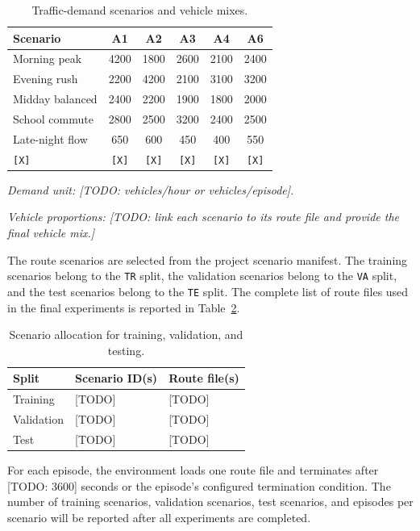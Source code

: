 \begin{table}[t]
\caption{Traffic-demand scenarios and vehicle mixes.}
\label{tab:traffic_demand}
\centering
\small
\begin{tabular}{lccccc}
\hline
\textbf{Scenario} & \textbf{A1} & \textbf{A2} & \textbf{A3}
& \textbf{A4} & \textbf{A6} \\
\hline
Morning peak      & 4200 & 1800 & 2600 & 2100 & 2400 \\
Evening rush      & 2200 & 4200 & 2100 & 3100 & 3200 \\
Midday balanced   & 2400 & 2200 & 1900 & 1800 & 2000 \\
School commute    & 2800 & 2500 & 3200 & 2400 & 2500 \\
Late-night flow   & 650 & 600 & 450 & 400 & 550 \\
\texttt{[X]} & \texttt{[X]} & \texttt{[X]} & \texttt{[X]} & \texttt{[X]} & \texttt{[X]} \\
\hline
\end{tabular}
\begin{minipage}{\columnwidth}
\footnotesize
\textit{Demand unit: [TODO: vehicles/hour or vehicles/episode].}\par
\textit{Vehicle proportions: [TODO: link each scenario to its route file
and provide the final vehicle mix.]}
\end{minipage}
\end{table}

The route scenarios are selected from the project scenario manifest. The
training scenarios belong to the \texttt{TR} split, the validation scenarios
belong to the \texttt{VA} split, and the test scenarios belong to the
\texttt{TE} split. The complete list of route files used in the final
experiments is reported in Table~\ref{tab:scenario_splits}.

\begin{table}[t]
\caption{Scenario allocation for training, validation, and testing.}
\label{tab:scenario_splits}
\centering
\begin{tabular}{lll}
\hline
\textbf{Split} & \textbf{Scenario ID(s)} & \textbf{Route file(s)} \\
\hline
Training     & [TODO] & [TODO] \\
Validation   & [TODO] & [TODO] \\
Test         & [TODO] & [TODO] \\
\hline
\end{tabular}
\end{table}

For each episode, the environment loads one route file and terminates after
[TODO: 3600] seconds or the episode's configured termination condition.
The number of training scenarios, validation scenarios, test scenarios, and
episodes per scenario will be reported after all experiments are completed.